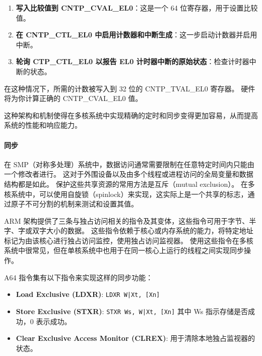 
\begin{enumerate}
  \item
    \textbf{写入比较值到 CNTP\_CVAL\_EL0}：这是一个 64 位寄存器，用于设置比较值。
  \item
    \textbf{在 CNTP\_CTL\_EL0 中启用计数器和中断生成}：这一步启动计数器并启用中断。
  \item
    \textbf{轮询 CTP\_CTL\_EL0 以报告 EL0 计时器中断的原始状态}：检查计时器中断的状态。
\end{enumerate}


在这种情况下，所需的计数被写入到 32 位的 CNTP\_TVAL\_EL0 寄存器。
硬件将为你计算正确的 CNTP\_CVAL\_EL0 值。

这种架构和机制使得在多核系统中实现精确的定时和同步变得更加容易，从而提高系统的性能和响应能力。

\paragraph{同步}

在 SMP（对称多处理）系统中，数据访问通常需要限制在任意特定时间内只能由一个修改者进行。
这对于外围设备以及由多个线程或进程访问的全局变量和数据结构都是如此。
保护这些共享资源的常用方法是互斥（mutual exclusion）。
在多核系统中，可以使用自旋锁（spinlock）来实现，这实际上是一个共享的标志，通过原子不可分割的机制来测试和设置其值。

ARM 架构提供了三条与独占访问相关的指令及其变体，这些指令可用于字节、半字、字或双字大小的数据。
这些指令依赖于核心或内存系统的能力，将特定地址标记为由该核心进行独占访问监控，使用独占访问监视器。
使用这些指令在多核系统中很常见，但在单核系统中也用于在同一核心上运行的线程之间实现同步操作。

A64 指令集有以下指令来实现这样的同步功能：

\begin{itemize}
\item
  \textbf{Load Exclusive (LDXR)}:
  {\lstinline!LDXR W|Xt, [Xn]!}
\item
  \textbf{Store Exclusive (STXR)}:
  {\lstinline!STXR Ws, W|Xt, [Xn]!}
  其中 Ws 指示存储是否成功，0 表示成功。
\item
  \textbf{Clear Exclusive Access Monitor (CLREX)}:
  用于清除本地独占监视器的状态。
\end{itemize}



